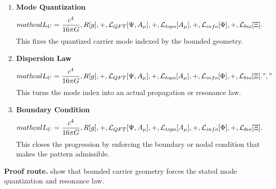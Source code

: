 \begin{enumerate}[leftmargin=1.6em,itemsep=9pt,topsep=6pt]
\item \textbf{Mode Quantization}
\[
mathcal{L}_U = \frac{c^4}{16\pi G}\\,R[g] \\, + \\, \mathcal{L}_{QFT}[\Psi, A_\mu] \\, + \\, \mathcal{L}_{topo}[A_\mu] \\, + \\, \mathcal{L}_{info}[\Phi] \\, + \\, \mathcal{L}_{bio}[\Xi].
\]
This fixes the quantized carrier mode indexed by the bounded geometry.

\item \textbf{Dispersion Law}
\[
mathcal{L}_U = \frac{c^4}{16\pi G}\\,R[g] \\, + \\, \mathcal{L}_{QFT}[\Psi, A_\mu] \\, + \\, \mathcal{L}_{topo}[A_\mu] \\, + \\, \mathcal{L}_{info}[\Phi] \\, + \\, \mathcal{L}_{bio}[\Xi].","
\]
This turns the mode index into an actual propagation or resonance law.

\item \textbf{Boundary Condition}
\[
mathcal{L}_U = \frac{c^4}{16\pi G}\\,R[g] \\, + \\, \mathcal{L}_{QFT}[\Psi, A_\mu] \\, + \\, \mathcal{L}_{topo}[A_\mu] \\, + \\, \mathcal{L}_{info}[\Phi] \\, + \\, \mathcal{L}_{bio}[\Xi].
\]
This closes the progression by enforcing the boundary or nodal condition that makes the pattern admissible.
\end{enumerate}

\textbf{Proof route.} show that bounded carrier geometry forces the stated mode quantization and resonance law.

